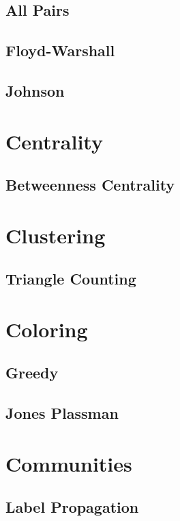 \subsection{All Pairs}
\subsection{Floyd-Warshall}
\subsection{Johnson}

\section{Centrality}
\subsection{Betweenness Centrality}

\section{Clustering}
\subsection{Triangle Counting}

\section{Coloring}
\subsection{Greedy}
\subsection{Jones Plassman}

\section{Communities}
\subsection{Label Propagation}
